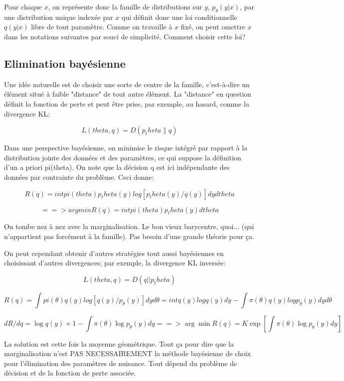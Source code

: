 \documentclass{article}
\begin{document}
Pour chaque $x$, on repr\'esente donc la famille de distributions sur $y$, $p_\theta(y|x)$, par une distribution unique index\'ee par $x$ qui d\'efinit donc une loi conditionnelle $q(y|x)$ libre de tout param\`etre. Comme on travaille \`a $x$ fix\'e, on peut omettre $x$ dans les notations suivantes par souci de simplicit\'e. Comment choisir cette loi?  


\subsection{Elimination bay\'esienne}

Une id\'ee naturelle est de choisir une sorte de centre de la famille, c'est-\`a-dire un \'el\'ement situ\'e \`a faible "distance" de tout autre \'el\'ement. La "distance" en question d\'efinit la fonction de perte et peut \^etre prise, par exemple, au hasard, comme la divergence KL: 

$$L(theta, q) = D(p_theta\|q)$$

Dans une perspective bay\'esienne, on minimise le risque int\'egr\'e par rapport \`a la distribution jointe des donn\'ees et des param\`etres, ce qui suppose la d\'efinition d'un a priori pi(theta). On note que la d\'ecision q est ici ind\'ependante des donn\'ees par contrainte du probl\`eme. Ceci donne: 

$$R(q) = int pi(theta) p_theta(y) log [p_theta(y) / q(y)] dy dtheta$$ 

$$==> argmin R(q) = int pi(theta) p_theta(y) dtheta$$ 

On tombe nez \`a nez avec la marginalisation. Le bon vieux barycentre, quoi... (qui n'appartient pas forc\'ement \`a la famille). Pas besoin d'une grande th\'eorie pour \c{c}a. 

On peut cependant obtenir d'autres strat\'egies tout aussi bay\'esiennes en choisissant d'autres divergences; par exemple, la divergence KL invers\'ee: 

$$L(theta, q) = D(q||p_theta)$$ 

$$
R(q) = \int pi(\theta)q(y) log[q(y) / p_\theta(y)] dy d\theta = int q(y) log q(y) dy - \int \pi(\theta) q(y) log p_\theta(y) dy d\theta
$$ 

$$ dR / dq = \log q(y) + 1 - \int \pi(\theta) \log p_\theta(y) dy ==> \arg\min R(q) = K \exp[\int \pi(\theta) \log p_\theta(y) dy ]$$ 

La solution est cette fois la moyenne g\'eom\'etrique. Tout \c{c}a pour dire que la marginalisation n'est PAS NECESSAIREMENT la m\'ethode bay\'esienne de choix pour l'\'elimination des param\`etres de nuisance. Tout d\'epend du probl\`eme de d\'ecision et de la fonction de perte associ\'ee. 
\end{document}
